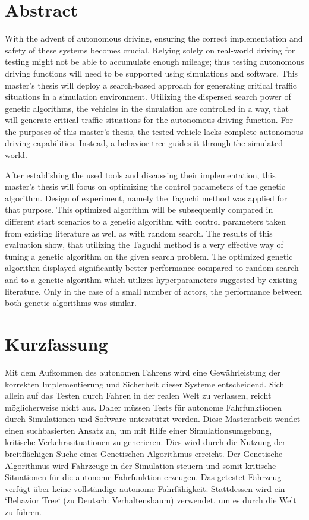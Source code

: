 \chapter*{Abstract}
\label{chap:abstract}

With the advent of autonomous driving, ensuring the correct implementation and safety of these systems becomes crucial. Relying solely on real-world driving for testing might not be able to accumulate enough mileage; thus testing autonomous driving functions will need to be supported using simulations and software. This master's thesis will deploy a search-based approach for generating critical traffic situations in a simulation environment. Utilizing the dispersed search power of genetic algorithms, the vehicles in the simulation are controlled in a way, that will generate critical traffic situations for the autonomous driving function. For the purposes of this master's thesis, the tested vehicle lacks complete autonomous driving capabilities. Instead, a behavior tree guides it through the simulated world.

After establishing the used tools and discussing their implementation, this master's thesis will focus on optimizing the control parameters of the genetic algorithm. Design of experiment, namely the Taguchi method was applied for that purpose. This optimized algorithm will be subsequently compared in different start scenarios to a genetic algorithm with control parameters taken from existing literature as well as with random search. The results of this evaluation show, that utilizing the Taguchi method is a very effective way of tuning a genetic algorithm on the given search problem. The optimized genetic algorithm displayed significantly better performance compared to random search and to a genetic algorithm which utilizes hyperparameters suggested by existing literature. Only in the case of a small number of actors, the performance between both genetic algorithms was similar.


\chapter*{Kurzfassung}
\label{chap:kurzfassung}
Mit dem Aufkommen des autonomen Fahrens wird eine Gewährleistung der korrekten Implementierung und Sicherheit dieser Systeme entscheidend. Sich allein auf das Testen durch Fahren in der realen Welt zu verlassen, reicht möglicherweise nicht aus. Daher müssen Tests für autonome Fahrfunktionen durch Simulationen und Software unterstützt werden. Diese Masterarbeit wendet einen suchbasierten Ansatz an, um mit Hilfe einer Simulationsumgebung, kritische Verkehrssituationen zu generieren. Dies wird durch die Nutzung der breitflächigen Suche eines Genetischen Algorithmus erreicht. Der Genetische Algorithmus wird Fahrzeuge in der Simulation steuern und somit kritische Situationen für die autonome Fahrfunktion erzeugen. Das getestet Fahrzeug verfügt über keine vollständige autonome Fahrfähigkeit. Stattdessen wird ein ‘Behavior Tree‘ (zu Deutsch: Verhaltensbaum) verwendet, um es durch die Welt zu führen.

